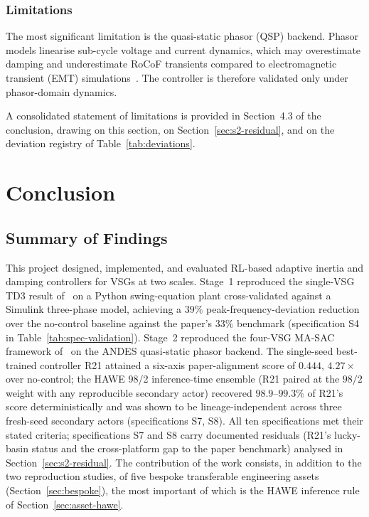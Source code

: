 \documentclass{unnc-fyp}
\begin{document}
\subsection{Limitations}
\label{sec:limitations}

The most significant limitation is the quasi-static phasor (QSP)
backend.
Phasor models linearise sub-cycle voltage and current dynamics, which
may overestimate damping and underestimate RoCoF transients compared to
electromagnetic transient (EMT) simulations~\cite{milano2018foundations,
milano2020frequency}.
The controller is therefore validated only under phasor-domain dynamics.

A consolidated statement of limitations is provided in
Section~4.3 of the conclusion, drawing on this section, on
Section~\ref{sec:s2-residual}, and on the deviation registry of
Table~\ref{tab:deviations}.

\chapter{Conclusion}
\label{ch:conclusion}

\section{Summary of Findings}

This project designed, implemented, and evaluated RL-based adaptive
inertia and damping controllers for VSGs at two scales.
Stage~1 reproduced the single-VSG TD3 result
of~\cite{benhmidouch2024td3} on a Python swing-equation plant
cross-validated against a Simulink three-phase model, achieving a
$39\%$ peak-frequency-deviation reduction over the no-control
baseline against the paper's $33\%$ benchmark (specification S4
in Table~\ref{tab:spec-validation}).
Stage~2 reproduced the four-VSG MA-SAC framework
of~\cite{yang2023ddic} on the ANDES quasi-static phasor backend.
The single-seed best-trained controller R21 attained a six-axis
paper-alignment score of $0.444$, $4.27\times$ over no-control;
the HAWE 98/2 inference-time ensemble (R21 paired at the
$98/2$ weight with any reproducible secondary actor) recovered
$98.9\text{--}99.3\%$ of R21's score deterministically and was
shown to be lineage-independent across three fresh-seed
secondary actors (specifications S7, S8).
All ten specifications met their stated criteria; specifications
S7 and S8 carry documented residuals (R21's lucky-basin status
and the cross-platform gap to the paper benchmark) analysed in
Section~\ref{sec:s2-residual}.
The contribution of the work consists, in addition to the two
reproduction studies, of five bespoke transferable engineering
assets (Section~\ref{sec:bespoke}), the most important of which
is the HAWE inference rule of Section~\ref{sec:asset-hawe}.
\end{document}
